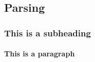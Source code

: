 \documentclass[../Main.tex]{subfiles}
\begin{document}
\subsection{Parsing}

\lipsum[10-14] %

\subsubsection{This is a subheading}

\lipsum[15-17] %

\paragraph{This is a paragraph}

\lipsum[18-19] %


\biblio %
\end{document}
